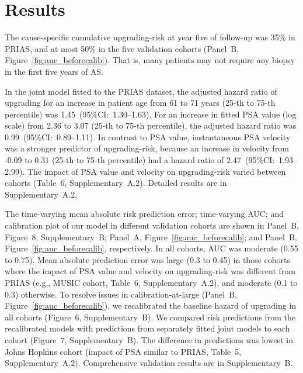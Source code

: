 \section{Results}
The cause-specific cumulative upgrading-risk at year five of follow-up was 35\% in PRIAS, and at most 50\% in the five validation cohorts (Panel~B, Figure~\ref{fig:auc_beforecalib}). That is, many patients may not require any biopsy in the first five years of AS.

In the joint model fitted to the PRIAS dataset, the adjusted hazard ratio of upgrading for an increase in patient age from 61 to 71 years (25-th to 75-th percentile) was 1.45~(95\%CI:~1.30--1.63). For an increase in fitted PSA value (log scale) from 2.36 to 3.07 (25-th to 75-th percentile), the adjusted hazard ratio was 0.99~(95\%CI:~0.89--1.11). In contrast to PSA value, instantaneous PSA velocity was a stronger predictor of upgrading-risk, because an increase in velocity from -0.09 to 0.31 (25-th to 75-th percentile) had a hazard ratio of 2.47~(95\%CI:~1.93--2.99). The impact of PSA value and velocity on upgrading-risk varied between cohorts (Table~6, Supplementary~A.2). Detailed results are in Supplementary~A.2.

The time-varying mean absolute risk prediction error; time-varying AUC; and calibration plot of our model in different validation cohorts are shown in Panel~B, Figure~8, Supplementary~B; Panel~A, Figure~\ref{fig:auc_beforecalib}; and Panel~B, Figure~\ref{fig:auc_beforecalib}, respectively. In all cohorts, AUC was moderate (0.55 to 0.75). Mean absolute prediction error was large (0.3 to 0.45) in those cohorts where the impact of PSA value and velocity on upgrading-risk was different from PRIAS (e.g., MUSIC cohort, Table~6, Supplementary~A.2), and moderate (0.1 to 0.3) otherwise. To resolve issues in calibration-at-large (Panel~B, Figure~\ref{fig:auc_beforecalib}), we recalibrated the baseline hazard of upgrading in all cohorts (Figure~6, Supplementary~B). We compared risk predictions from the recalibrated models with predictions from separately fitted joint models to each cohort (Figure~7, Supplementary~B). The difference in predictions was lowest in Johns Hopkins cohort (impact of PSA similar to PRIAS, Table~5, Supplementary~A.2). Comprehensive validation results are in Supplementary~B.


